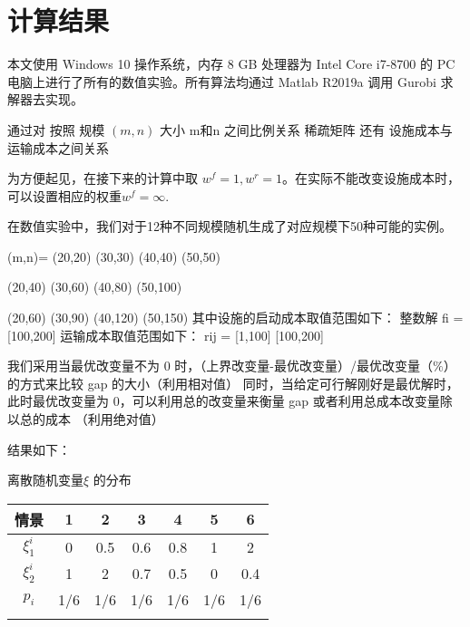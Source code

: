 \documentclass[UTF8]{article}
\begin{document}
%
%

\section{计算结果}

本文使用 Windows 10 操作系统，内存 8 GB 处理器为 Intel Core i7-8700 的 PC 电脑上进行了所有的数值实验。所有算法均通过 Matlab R2019a 调用 Gurobi 求解器去实现。

通过对
按照 规模 $(m,n)$ 大小  m和n 之间比例关系 稀疏矩阵 还有  设施成本与运输成本之间关系

为方便起见，在接下来的计算中取 $w^f=1,w^r=1$。在实际不能改变设施成本时，可以设置相应的权重$w^f=\infty$.

在数值实验中，我们对于12种不同规模随机生成了对应规模下50种可能的实例。

(m,n)= (20,20) (30,30) (40,40) (50,50)

       (20,40) (30,60) (40,80) (50,100)

       (20,60) (30,90) (40,120) (50,150)
其中设施的启动成本取值范围如下：   整数解   fi =[100,200]
    运输成本取值范围如下：      rij = [1,100] [100,200]


我们采用当最优改变量不为 0 时，（上界改变量-最优改变量）/最优改变量（$\%$）的方式来比较 gap 的大小（利用相对值）
同时，当给定可行解刚好是最优解时，此时最优改变量为 0，可以利用总的改变量来衡量 gap 或者利用总成本改变量除以总的成本 （利用绝对值）

结果如下：
{\small\begin{table}[h!]

\centerline{\small{\heiti{}}  离散随机变量$\xi$ 的分布}
\vskip 2mm
\centering
\begin{tabular}{ccccccc}
    \shline
情景&1&2&3&4&5&6\\
    \hline
$\xi_1^i$ & 0 & 0.5 & 0.6  & 0.8  & 1 & 2\\
$\xi_2^i$ & 1 & 2   & 0.7  & 0.5 & 0 & 0.4\\

$p_i$ &1/6&1/6&1/6&1/6&1/6&1/6\\
   \shline
 \end{tabular}
 \end{table}}
\end{document}
